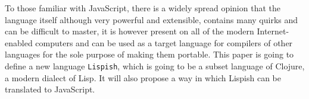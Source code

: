 To those familiar with JavaScript, there is a widely spread opinion that the language itself although very powerful and extensible, contains many quirks and can be difficult to master, it is however present on all of the modern Internet-enabled computers and can be used as a target language for compilers of other languages for the sole purpose of making them portable. 
This paper is going to define a new language \texttt{Lispish}, which is going to be a subset language of Clojure, a modern dialect of Lisp. It will also propose a way in which Lispish can be translated to JavaScript.